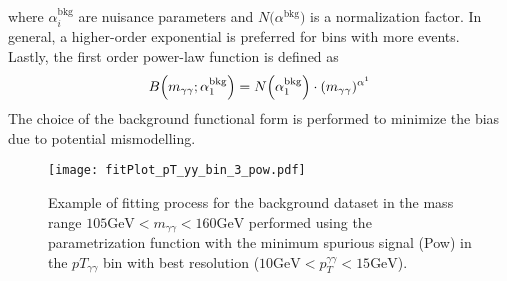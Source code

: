 where $\alpha_i^{\text{bkg}}$ are nuisance parameters and $N($\textbf{$\alpha^{\text{bkg}}$}$)$ is a normalization factor. In general, a higher-order exponential is preferred for bins with more events.
\\
Lastly, the first order power-law function is defined as
\begin{equation}
B\Bigl(m_{\gamma\gamma}; \alpha_1^{\text{bkg}}\Bigr) = N\Bigl(\alpha_1^{\text{bkg}}\Bigr) \cdot (m_{\gamma\gamma})^{\alpha^1}
\end{equation}
The choice of the background functional form is performed to minimize the bias due to potential mismodelling.
\begin{figure}[hbt]
\centering
\texttt{[image: fitPlot\_pT\_yy\_bin\_3\_pow.pdf]}
\caption{Example of fitting process for the background dataset in the mass range $105 \text{GeV} < m_{\gamma\gamma} < 160 \text{GeV}$ performed using the parametrization function with the minimum spurious signal (Pow) in the $pT_{\gamma\gamma}$ bin with best resolution ($10 \text{GeV} < p_T^{\gamma\gamma} < 15 \text{GeV}$).}
\label{bkg_example}
\end{figure}

